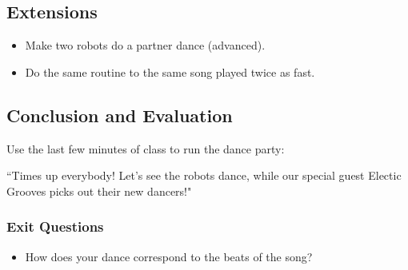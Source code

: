 \documentclass{lessonplan}
\begin{document}
    \subsection{Extensions}
      \begin{itemize}
        \item Make two robots do a partner dance (advanced).
        \item Do the same routine to the same song played twice as fast.
      \end{itemize}
    \subsection{Conclusion and Evaluation}
      Use the last few minutes of class to run the dance party:

      ``Times up everybody! Let's see the robots dance, while our special guest Electic Grooves
      picks out their new dancers!"

      \subsubsection{Exit Questions}
      \begin{itemize}
        \item How does your dance correspond to the beats of the song?
      \end{itemize}
\end{document}
